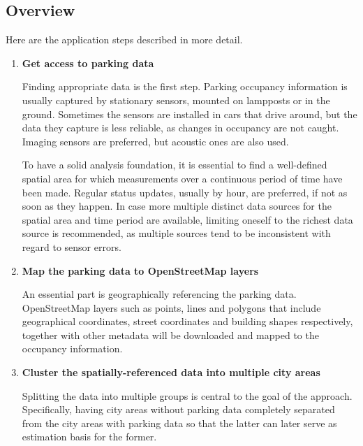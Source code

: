 \documentclass{ws-ijait}
\begin{document}
	\subsection{Overview}
	Here are the application steps described in more detail. 
	
	\begin{enumerate}[label=\Roman*]
				
		\item{\textbf{Get access to parking data}}
		
		Finding appropriate data is the first step. Parking occupancy information is usually captured by stationary sensors, mounted on lampposts or in the ground. Sometimes the sensors are installed in cars that drive around, but the data they capture is less reliable, as changes in occupancy are not caught. Imaging sensors are preferred, but acoustic ones are also used.
		
		To have a solid analysis foundation, it is essential to find a well-defined spatial area for which measurements over a continuous period of time have been made. Regular status updates, usually by hour, are preferred, if not as soon as they happen. In case more multiple distinct data sources for the spatial area and time period are available, limiting oneself to the richest data source is recommended, as multiple sources tend to be inconsistent with regard to sensor errors.
		
		
		\item{\textbf{Map the parking data to OpenStreetMap layers}}
		
		An essential part is geographically referencing the parking data. OpenStreetMap layers such as points, lines and polygons that include geographical coordinates, street coordinates and building shapes respectively, together with other metadata will be downloaded and mapped to the occupancy information.
		
		\item{\textbf{Cluster the spatially-referenced data into multiple city areas}}
		
		Splitting the data into multiple groups is central to the goal of the approach. Specifically, having city areas without parking data completely separated from the city areas with parking data so that the latter can later serve as estimation basis for the former. 
		

\end{enumerate}
\end{document}
